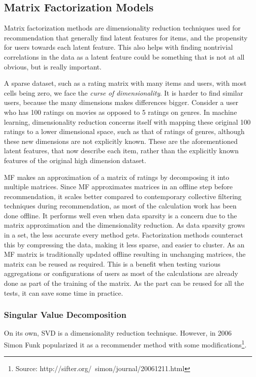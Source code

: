\subsection{Matrix Factorization Models} \label{bg:sub:factorizationmodels}
Matrix factorization methods are dimensionality reduction techniques used for recommendation that generally find latent features for items, and the propensity for users towards each latent feature. This also helps with finding nontrivial correlations in the data as a latent feature could be something that is not at all obvious, but is really important.

A sparse dataset, such as a rating matrix with many items and users, with most cells being zero, we face the \textit{curse of dimensionality}. It is harder to find similar users, because the many dimensions makes differences bigger. Consider a user who has 100 ratings on movies as opposed to 5 ratings on genres. In machine learning, dimensionality reduction concerns itself with mapping these original 100 ratings to a lower dimensional space, such as that of ratings of genres, although these new dimensions are not explicitly known. These are the aforementioned latent features, that now describe each item, rather than the explicitly known features of the original high dimension dataset\cite{recsys_dimensionalityreduction}.

MF makes an approximation of a matrix of ratings by decomposing it into multiple matrices. Since MF approximates matrices in an offline step before recommendation, it scales better compared to contemporary collective filtering techniques during recommendation, as most of the calculation work has been done offline. It performs well even when data sparsity is a concern due to the matrix approximation and the dimensionality reduction.
As data sparsity grows in a set, the less accurate every method gets. Factorization methods counteract this by compressing the data, making it less sparse, and easier to cluster.
As an MF matrix is traditionally updated offline resulting in unchanging matrices, the matrix can be reused as required. This is a benefit when testing various aggregations or configurations of users as most of the calculations are already done as part of the training of the matrix. As the part can be reused for all the tests, it can save some time in practice.

\subsubsection{Singular Value Decomposition}
On its own, SVD is a dimensionality reduction technique. However, in 2006 Simon Funk popularized it as a recommender method with some modifications\footnote{Source: http://sifter.org/~simon/journal/20061211.html}\cite{svdsimonfunk}.

